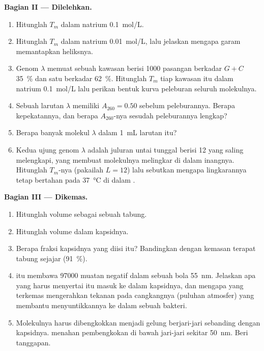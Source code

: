 \begin{problem}
\medskip
\noindent\textbf{Bagian II --- Dilelehkan.}
\begin{enumerate}[resume]
  \item Hitunglah $T_m$ dalam natrium \qty{0.1}{mol/L}.
  \item Hitunglah $T_m$ dalam natrium \qty{0.01}{mol/L}, lalu jelaskan
        mengapa garam memantapkan heliksnya.
  \item Genom $\lambda$ memuat sebuah kawasan berisi \qty{1000}{}
        pasangan berkadar $G + C$ \qty{35}{\%} dan satu berkadar
        \qty{62}{\%}. Hitunglah $T_m$ tiap kawasan itu dalam natrium
        \qty{0.1}{mol/L} lalu perikan bentuk kurva peleburan seluruh
        molekulnya.
  \item Sebuah larutan  $\lambda$ memiliki $A_{260} = 0.50$ sebelum
        peleburannya. Berapa kepekatannya, dan berapa $A_{260}$-nya
        sesudah peleburannya lengkap?
  \item Berapa banyak molekul $\lambda$ dalam \qty{1}{mL} larutan itu?
  \item Kedua ujung genom $\lambda$ adalah juluran untai tunggal berisi
        12  yang saling melengkapi, yang membuat molekulnya
        melingkar di dalam inangnya. Hitunglah $T_m$-nya (pakailah
        $L = 12$) lalu sebutkan mengapa lingkarannya tetap bertahan pada
        \qty{37}{\celsius} di dalam .
\end{enumerate}

\medskip
\noindent\textbf{Bagian III --- Dikemas.}
\begin{enumerate}[resume]
  \item Hitunglah volume  sebagai sebuah tabung.
  \item Hitunglah volume dalam kapsidnya.
  \item Berapa fraksi kapsidnya yang diisi  itu? Bandingkan dengan
        kemasan terapat tabung sejajar (\qty{91}{\%}).
  \item {} itu membawa \num{97000} muatan negatif dalam sebuah bola
        \qty{55}{nm}. Jelaskan apa yang harus menyertai  itu masuk ke
        dalam kapsidnya, dan mengapa  yang terkemas mengerahkan
        tekanan pada cangkangnya (puluhan atmosfer) yang membantu
        menyuntikkannya ke dalam sebuah bakteri.
  \item Molekulnya harus dibengkokkan menjadi gelung berjari-jari
        sebanding dengan kapsidnya.  menahan pembengkokan di bawah
        jari-jari sekitar \qty{50}{nm}. Beri tanggapan.
\end{enumerate}


\end{problem}
